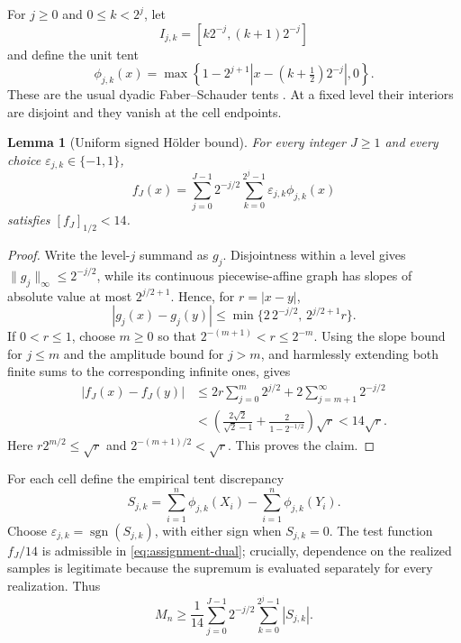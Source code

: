 \documentclass[11pt]{article}
\newtheorem{lemma}[theorem]{Lemma}
\begin{document}
For \(j\ge0\) and \(0\le k<2^j\), let
\[
 I_{j,k}=[k2^{-j},(k+1)2^{-j}]
\]
and define the unit tent
\[
 \phi_{j,k}(x)=
 \max\!\left\{1-2^{j+1}\left|x-(k+\tfrac12)2^{-j}\right|,0\right\}.
\]
These are the usual dyadic Faber--Schauder tents \cite{Schauder}.  At a fixed
level their interiors are disjoint and they vanish at the cell endpoints.

\begin{lemma}[Uniform signed Hölder bound]\label{lem:holder}
For every integer \(J\ge1\) and every choice
\(\varepsilon_{j,k}\in\{-1,1\}\),
\[
 f_J(x)=\sum_{j=0}^{J-1}2^{-j/2}
          \sum_{k=0}^{2^j-1}\varepsilon_{j,k}\phi_{j,k}(x)
\]
satisfies \([f_J]_{1/2}<14\).
\end{lemma}

\begin{proof}
Write the level-\(j\) summand as \(g_j\).  Disjointness within a level gives
\(\|g_j\|_\infty\le2^{-j/2}\), while its continuous piecewise-affine graph
has slopes of absolute value at most \(2^{j/2+1}\).  Hence, for
\(r=|x-y|\),
\begin{equation}\label{eq:level-bound}
 |g_j(x)-g_j(y)|
 \le\min\{2\,2^{-j/2},\,2^{j/2+1}r\}.
\end{equation}
If \(0<r\le1\), choose \(m\ge0\) so that
\(2^{-(m+1)}<r\le2^{-m}\).  Using the slope bound for \(j\le m\) and the
amplitude bound for \(j>m\), and harmlessly extending both finite sums to the
corresponding infinite ones, gives
\begin{align*}
 |f_J(x)-f_J(y)|
 &\le 2r\sum_{j=0}^{m}2^{j/2}
      +2\sum_{j=m+1}^{\infty}2^{-j/2}\\
 &<\left(\frac{2\sqrt2}{\sqrt2-1}
       +\frac{2}{1-2^{-1/2}}\right)\sqrt r
 <14\sqrt r.
\end{align*}
Here \(r2^{m/2}\le\sqrt r\) and
\(2^{-(m+1)/2}<\sqrt r\).  This proves the claim.
\end{proof}

For each cell define the empirical tent discrepancy
\[
 S_{j,k}=\sum_{i=1}^n\phi_{j,k}(X_i)
          -\sum_{i=1}^n\phi_{j,k}(Y_i).
\]
Choose \(\varepsilon_{j,k}=\operatorname{sgn}(S_{j,k})\), with either sign
when \(S_{j,k}=0\).  The test function \(f_J/14\) is admissible in
\eqref{eq:assignment-dual}; crucially, dependence on the realized samples is
legitimate because the supremum is evaluated separately for every realization.
Thus
\begin{equation}\label{eq:dual-lower}
 M_n\ge\frac1{14}\sum_{j=0}^{J-1}2^{-j/2}
             \sum_{k=0}^{2^j-1}|S_{j,k}|.
\end{equation}
\end{document}
